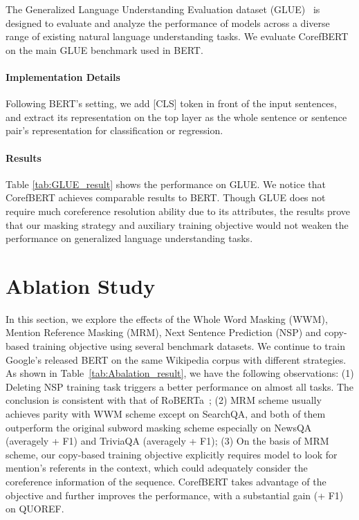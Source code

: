 \documentclass[11pt,a4paper]{article}
\newcommand\CorefBERT{CorefBERT\xspace}
\newcommand\BASESIZE{\xspace}
\begin{document}
The Generalized Language Understanding Evaluation  dataset (GLUE)~\citep{GLUE} is designed to evaluate and analyze the performance of models across a diverse range of existing natural language understanding tasks. We evaluate \CorefBERT on the main GLUE benchmark used in BERT.

\vspace{-0.1em}
\paragraph{Implementation Details}
Following BERT's setting, we add \textup{[CLS]} token in front of the input sentences, and extract its representation on the top layer as the whole sentence or sentence pair's representation for classification or regression. 

\vspace{-0.1em}
\paragraph{Results}
Table \ref{tab:GLUE_result} shows the performance on GLUE. We notice that CorefBERT achieves comparable results to BERT. Though GLUE does not require much coreference resolution ability due to its attributes, the results prove that our masking strategy and auxiliary training objective would not weaken the performance on generalized language understanding tasks.





\section{Ablation Study}



In this section, we explore the effects of the Whole Word Masking (WWM), Mention Reference Masking (MRM), Next Sentence Prediction (NSP) and copy-based training objective using several benchmark datasets. We continue to train Google's released BERT\BASESIZE on the same Wikipedia corpus with different strategies. As shown in Table~\ref{tab:Abalation_result}, we have the following observations: (1) Deleting NSP training task triggers a better performance on almost all tasks. The conclusion is consistent with that of RoBERTa~\citep{Roberta}; (2) MRM scheme usually achieves parity with WWM scheme except on SearchQA, and both of them outperform the original subword masking scheme especially on NewsQA (averagely + F1) and TriviaQA (averagely + F1); (3) On the basis of MRM scheme, our copy-based training objective explicitly requires  model to look for mention's referents in the context, which could adequately consider the coreference information of the sequence. \CorefBERT takes advantage of the objective and further improves the performance, with a substantial gain (+ F1) on QUOREF.
\end{document}
